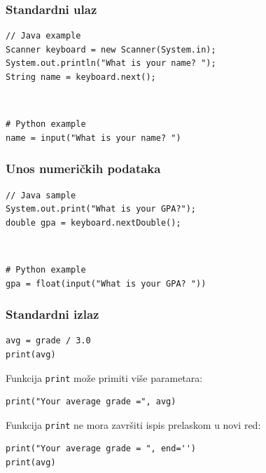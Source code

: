 \documentclass[compress]{beamer}
\begin{document}
\begin{frame}[fragile]
\frametitle{Standardni ulaz}
\begin{verbatim}
// Java example
Scanner keyboard = new Scanner(System.in);
System.out.println("What is your name? ");
String name = keyboard.next();
\end{verbatim}

\ %

\begin{verbatim}
# Python example
name = input("What is your name? ")
\end{verbatim}
\end{frame}

\begin{frame}[fragile]
\frametitle{Unos numeričkih podataka}
\begin{verbatim}
// Java sample
System.out.print("What is your GPA?");
double gpa = keyboard.nextDouble();
\end{verbatim}

\ %

\begin{verbatim}
# Python example
gpa = float(input("What is your GPA? "))
\end{verbatim}
\end{frame}

\begin{frame}[fragile]
\frametitle{Standardni izlaz}
\begin{verbatim}
avg = grade / 3.0
print(avg)
\end{verbatim}

Funkcija \texttt{print} može primiti više parametara:

\begin{verbatim}
print("Your average grade =", avg)
\end{verbatim}

Funkcija \texttt{print} ne mora završiti ispis prelaskom u novi red:

\begin{verbatim}
print("Your average grade = ", end='')
print(avg)
\end{verbatim}
\end{frame}
\end{document}
